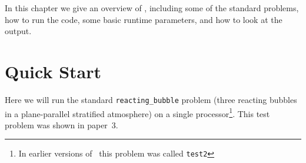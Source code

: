 

In this chapter we give an overview of \maestroex, including some of the
standard problems, how to run the code, some basic runtime parameters,
and how to look at the output.

\section{Quick Start}

Here we will run the standard {\tt reacting\_bubble} problem (three
reacting bubbles in a plane-parallel stratified atmosphere) on a
single processor\footnote{In earlier versions of \maestroex\ this
problem was called {\tt test2}}.  This test problem was shown in
paper~3.

